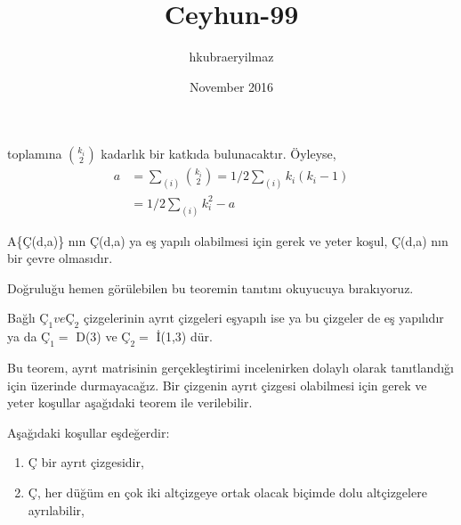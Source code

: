 \documentclass[11pt]{amsbook}
\title{Ceyhun-99}
\author{hkubraeryilmaz }
\date{November 2016}
\begin{document}

toplamına $\binom{k_i}{2}$ kadarlık bir katkıda bulunacaktır. Öyleyse,
\begin{align*}
    a &= \sum_{(i)} \binom{k_i}{2} = 1/2 \sum_{(i)} k_i (k_i-1) \\
    &= 1/2 \sum_{(i)} k_i^{2} -a
\end{align*}

\begin{theorem}
 A\{Ç(d,a)\} nın Ç(d,a) ya eş yapılı olabilmesi için gerek ve yeter koşul, Ç(d,a) nın bir çevre olmasıdır. 
\end{theorem}
Doğruluğu hemen görülebilen bu teoremin tanıtını okuyucuya bırakıyoruz.

\begin{theorem}
 Bağlı $Ç_1 ve Ç_2$ çizgelerinin ayrıt çizgeleri eşyapılı ise ya bu çizgeler de eş yapılıdır ya da  $Ç_1 =$ D(3) ve $Ç_2 =$ İ(1,3) dür.
\end{theorem}

Bu teorem, ayrıt matrisinin gerçekleştirimi incelenirken dolaylı olarak tanıtlandığı için üzerinde durmayacağız. Bir çizgenin ayrıt çizgesi olabilmesi için gerek ve yeter koşullar aşağıdaki teorem ile verilebilir. 

\begin{theorem}
 Aşağıdaki koşullar eşdeğerdir:
    \begin{enumerate} [label=\alph*)]
        \item Ç bir ayrıt çizgesidir,
        \item Ç, her düğüm en çok iki altçizgeye ortak olacak biçimde dolu altçizgelere ayrılabilir,
    \end{enumerate}
\end{theorem}
 
\end{document}
